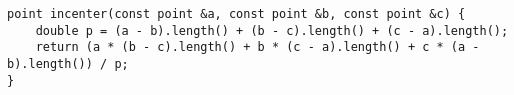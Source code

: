 \begin{lstlisting}
point incenter(const point &a, const point &b, const point &c) {
	double p = (a - b).length() + (b - c).length() + (c - a).length();
	return (a * (b - c).length() + b * (c - a).length() + c * (a - b).length()) / p;
}
\end{lstlisting}
	
